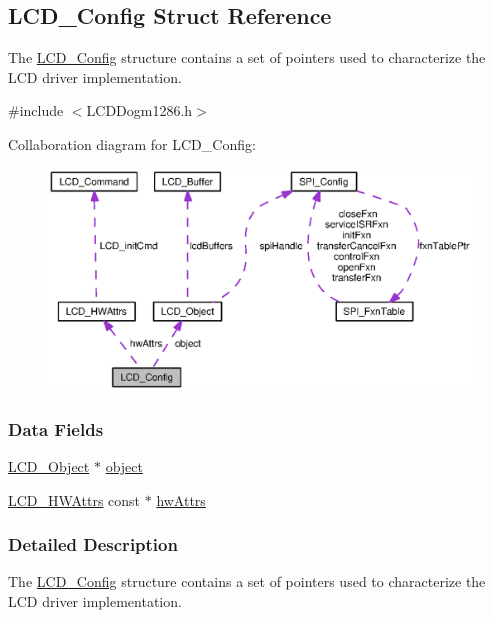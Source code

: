 \subsection{L\-C\-D\-\_\-\-Config Struct Reference}
\label{struct_l_c_d___config}


The \hyperlink{struct_l_c_d___config}{L\-C\-D\-\_\-\-Config} structure contains a set of pointers used to characterize the L\-C\-D driver implementation.  




{\ttfamily \#include $<$L\-C\-D\-Dogm1286.\-h$>$}



Collaboration diagram for L\-C\-D\-\_\-\-Config\-:
\nopagebreak
\begin{figure}[H]
\begin{center}
\leavevmode
\includegraphics[width=350pt]{struct_l_c_d___config__coll__graph}
\end{center}
\end{figure}
\subsubsection*{Data Fields}
\begin{DoxyCompactItemize}
\item 
\hyperlink{struct_l_c_d___object}{L\-C\-D\-\_\-\-Object} $\ast$ \hyperlink{struct_l_c_d___config_a264b39a3788c4e64089320afa5ad33fc}{object}
\item 
\hyperlink{struct_l_c_d___h_w_attrs}{L\-C\-D\-\_\-\-H\-W\-Attrs} const $\ast$ \hyperlink{struct_l_c_d___config_a76942612562659fe3b3254b24c66f2b9}{hw\-Attrs}
\end{DoxyCompactItemize}


\subsubsection{Detailed Description}
The \hyperlink{struct_l_c_d___config}{L\-C\-D\-\_\-\-Config} structure contains a set of pointers used to characterize the L\-C\-D driver implementation. 

